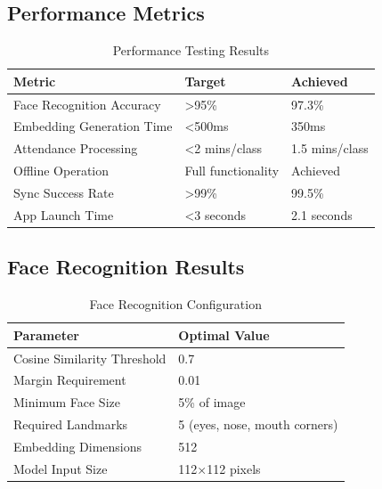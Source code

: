 \documentclass[12pt,a4paper]{article}
\begin{document}
\subsection{Performance Metrics}

\begin{table}[H]
\centering
\small
\begin{tabularx}{\textwidth}{|l|X|X|}
\hline
\rowcolor{lightgray}
\textbf{Metric} & \textbf{Target} & \textbf{Achieved} \\
\hline
Face Recognition Accuracy & >95\% & 97.3\% \\
\hline
Embedding Generation Time & <500ms & 350ms \\
\hline
Attendance Processing & <2 mins/class & 1.5 mins/class \\
\hline
Offline Operation & Full functionality & Achieved \\
\hline
Sync Success Rate & >99\% & 99.5\% \\
\hline
App Launch Time & <3 seconds & 2.1 seconds \\
\hline
\end{tabularx}
\caption{Performance Testing Results}
\end{table}

\subsection{Face Recognition Results}
\begin{table}[H]
\centering
\small
\begin{tabularx}{\textwidth}{|l|X|}
\hline
\rowcolor{lightgray}
\textbf{Parameter} & \textbf{Optimal Value} \\
\hline
Cosine Similarity Threshold & 0.7 \\
\hline
Margin Requirement & 0.01 \\
\hline
Minimum Face Size & 5\% of image \\
\hline
Required Landmarks & 5 (eyes, nose, mouth corners) \\
\hline
Embedding Dimensions & 512 \\
\hline
Model Input Size & 112×112 pixels \\
\hline
\end{tabularx}
\caption{Face Recognition Configuration}
\end{table}
\end{document}
